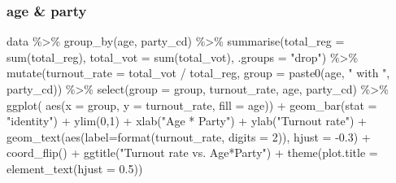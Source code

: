 \documentclass[
]{article}
\newenvironment{Shaded}{\begin{snugshade}}{\end{snugshade}}
\newcommand{\AttributeTok}[1]{\textcolor[rgb]{0.77,0.63,0.00}{#1}}
\newcommand{\DecValTok}[1]{\textcolor[rgb]{0.00,0.00,0.81}{#1}}
\newcommand{\FloatTok}[1]{\textcolor[rgb]{0.00,0.00,0.81}{#1}}
\newcommand{\FunctionTok}[1]{\textcolor[rgb]{0.00,0.00,0.00}{#1}}
\newcommand{\NormalTok}[1]{#1}
\newcommand{\SpecialCharTok}[1]{\textcolor[rgb]{0.00,0.00,0.00}{#1}}
\newcommand{\StringTok}[1]{\textcolor[rgb]{0.31,0.60,0.02}{#1}}
\begin{document}
\hypertarget{age-party}{%
\subsubsection{age \& party}\label{age-party}}

\begin{Shaded}
\begin{Highlighting}[]
\NormalTok{data }\SpecialCharTok{\%\textgreater{}\%}
  \FunctionTok{group\_by}\NormalTok{(age, party\_cd) }\SpecialCharTok{\%\textgreater{}\%}
  \FunctionTok{summarise}\NormalTok{(}\AttributeTok{total\_reg =} \FunctionTok{sum}\NormalTok{(total\_reg),}
            \AttributeTok{total\_vot =} \FunctionTok{sum}\NormalTok{(total\_vot), }\AttributeTok{.groups =} \StringTok{"drop"}\NormalTok{) }\SpecialCharTok{\%\textgreater{}\%}
  \FunctionTok{mutate}\NormalTok{(}\AttributeTok{turnout\_rate =}\NormalTok{ total\_vot }\SpecialCharTok{/}\NormalTok{ total\_reg,}
         \AttributeTok{group =} \FunctionTok{paste0}\NormalTok{(age, }\StringTok{" with "}\NormalTok{, party\_cd)) }\SpecialCharTok{\%\textgreater{}\%}
  \FunctionTok{select}\NormalTok{(}\AttributeTok{group =}\NormalTok{ group, turnout\_rate, age, party\_cd) }\SpecialCharTok{\%\textgreater{}\%}
  \FunctionTok{ggplot}\NormalTok{( }\FunctionTok{aes}\NormalTok{(}\AttributeTok{x =}\NormalTok{ group, }\AttributeTok{y =}\NormalTok{ turnout\_rate, }\AttributeTok{fill =}\NormalTok{ age)) }\SpecialCharTok{+}
  \FunctionTok{geom\_bar}\NormalTok{(}\AttributeTok{stat =} \StringTok{"identity"}\NormalTok{) }\SpecialCharTok{+}
  \FunctionTok{ylim}\NormalTok{(}\DecValTok{0}\NormalTok{,}\DecValTok{1}\NormalTok{) }\SpecialCharTok{+}
  \FunctionTok{xlab}\NormalTok{(}\StringTok{"Age * Party"}\NormalTok{) }\SpecialCharTok{+} \FunctionTok{ylab}\NormalTok{(}\StringTok{"Turnout rate"}\NormalTok{) }\SpecialCharTok{+}
  \FunctionTok{geom\_text}\NormalTok{(}\FunctionTok{aes}\NormalTok{(}\AttributeTok{label=}\FunctionTok{format}\NormalTok{(turnout\_rate, }\AttributeTok{digits =} \DecValTok{2}\NormalTok{)), }\AttributeTok{hjust =} \SpecialCharTok{{-}}\FloatTok{0.3}\NormalTok{) }\SpecialCharTok{+}
  \FunctionTok{coord\_flip}\NormalTok{() }\SpecialCharTok{+}
  \FunctionTok{ggtitle}\NormalTok{(}\StringTok{"Turnout rate vs. Age*Party"}\NormalTok{) }\SpecialCharTok{+}
    \FunctionTok{theme}\NormalTok{(}\AttributeTok{plot.title =} \FunctionTok{element\_text}\NormalTok{(}\AttributeTok{hjust =} \FloatTok{0.5}\NormalTok{))}
\end{Highlighting}
\end{Shaded}
\end{document}
